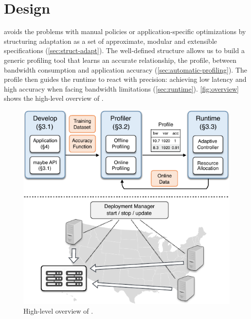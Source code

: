 \section{\sysname{} Design}
\label{sec:system}

\sysname{} avoids the problems with manual policies or application-specific
optimizations by structuring adaptation as a set of approximate, modular and
extensible specifications (\autoref{sec:struct-adapt}). The well-defined
structure allows us to build a generic profiling tool that learns an accurate
relationship, the profile, between bandwidth consumption and application
accuracy (\autoref{sec:automatic-profiling}). The profile then guides the
runtime to react with precision: achieving low latency and high accuracy when
facing bandwidth limitations (\autoref{sec:runtime}). \autoref{fig:overview}
shows the high-level overview of \sysname{}.

\begin{figure}
  \centering
  \includegraphics[width=0.8\linewidth]{figures/system.pdf}
  \caption{High-level overview of \sysname{}.}
  \label{fig:overview}
\end{figure}





